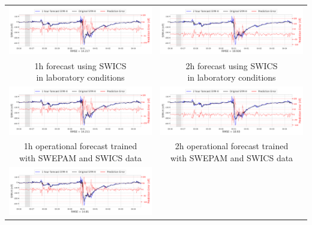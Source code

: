 \documentclass[draft,sw]{agutexSI2019}
\begin{document}
\begin{table}
\centering
\begin{tabular}{cc}
\includegraphics[width=0.49\linewidth]{paper_plots_shade/1h_swics/1h_swics_storm_33.png}
&
\includegraphics[width=0.49\linewidth]{paper_plots_shade/2h_swics/2h_swics_storm_33.png}
\\
\shortstack{1h forecast using SWICS\\ in laboratory conditions} & \shortstack{2h forecast using SWICS\\ in laboratory conditions}
\vspace*{12pt}
\\
\includegraphics[width=0.49\linewidth]{paper_plots_shade/1h_swics_rt/1h_swics_rt_storm_33.png}
&
\includegraphics[width=0.49\linewidth]{paper_plots_shade/2h_swics_rt/2h_swics_rt_storm_33.png}
\\
\shortstack{1h operational forecast trained\\ with SWEPAM and SWICS data} & \shortstack{2h operational forecast trained\\ with SWEPAM and SWICS data}
\vspace*{12pt}
\\
\includegraphics[width=0.49\linewidth]{paper_plots_shade/1h_swepam_rt/1h_swepam_rt_storm_33.png}

\end{tabular}
\end{table}
\end{document}
